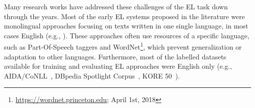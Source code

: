 \documentclass{llncs}
\begin{document}

 
Many research works have addressed these challenges of the EL task down through the years. Most of the early EL systems proposed in the literature were monolingual approaches focusing on texts written in one single language, in most cases English (e.g., \cite{mendes2011dbpedia,aida2011}). These approaches often use resources of a specific language, such as Part-Of-Speech taggers and WordNet\footnote{\url{https://wordnet.princeton.edu}; April 1st, 2018}, which prevent generalization or adaptation to other languages. Furthermore, most of the labelled datasets available for training and evaluating EL approaches were English only (e.g., AIDA/CoNLL~\cite{aida2011}, DBpedia Spotlight Corpus~\cite{mendes2011dbpedia}, KORE 50~\cite{kore50}). 
\end{document}
